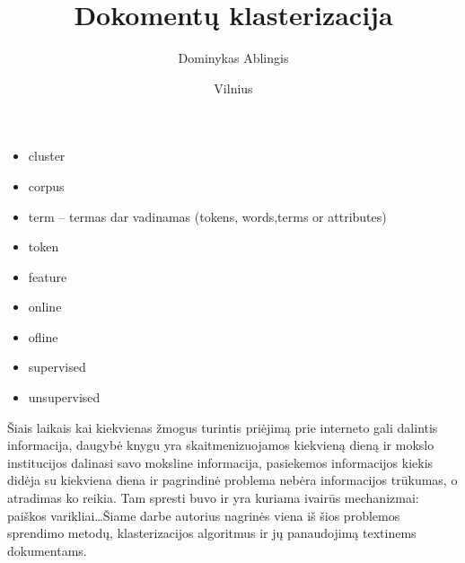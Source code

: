 \documentclass{VUMIFInfKursinis}
\title{Dokomentų klasterizacija}
\author{Dominykas Ablingis}
\date{Vilnius \\ \the\year}
\newif\iffast{}
\begin{document}
\iffast{}
	\newcommand{\rewrite}[1]{\todo[linecolor=red,backgroundcolor=red!25,bordercolor=red]{#1}}
	\newcommand{\needsource}[1]{\todo[linecolor=blue,backgroundcolor=blue!25,bordercolor=blue,]{#1}}
	\newcommand{\toadd}[1]{\todo[linecolor=OliveGreen,backgroundcolor=OliveGreen!25,bordercolor=OliveGreen,]{#1}}
	\newcommand{\note}[1]{\todo[linecolor=Plum,backgroundcolor=Plum!25,bordercolor=Plum]{#1}}
	\newcommand{\thiswillnotshow}[1]{\todo[disable]{#1}}
	\listoftodos[Notes]
\else
	\newcommand{\rewrite}[1]{}
	\newcommand{\needsource}[1]{}
	\newcommand{\toadd}[1]{}
	\newcommand{\note}[1]{}
	\newcommand{\thiswillnotshow}[1]{}
\fi

\maketitle
\tableofcontents


\newcommand{\ltang}[2]{#1 (angl.\  \textit{#2}) }
\newcommand{\BigO}[1]{$\mathcal{O}(#1)$}

\begin{itemize}
	\item cluster
	\item corpus
	\item term – termas dar vadinamas (tokens, words,terms or attributes)
	\item token
	\item feature
	\item online
	\item ofline
	\item supervised
	\item unsupervised
\end{itemize}

Šiais laikais kai kiekvienas žmogus turintis priėjimą prie interneto gali dalintis informacija, daugybė knygu yra skaitmenizuojamos kiekvieną dieną ir mokslo institucijos dalinasi savo moksline informacija, pasiekemos informacijos kiekis didėja su kiekviena diena ir pagrindinė problema nebėra informacijos trūkumas, o atradimas ko reikia. Tam spresti buvo ir yra kuriama ivairūs mechanizmai: paiškos varikliai\ldots Šiame darbe autorius nagrinės viena iš šios problemos sprendimo metodų, klasterizacijos algoritmus ir jų panaudojimą textinems dokumentams. %
\end{document}
